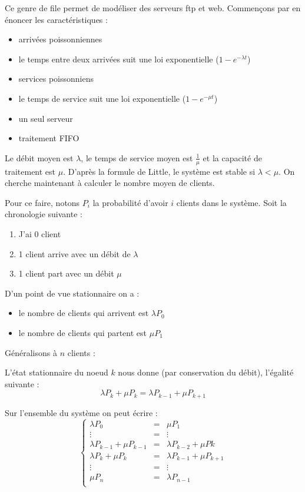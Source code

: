 \documentclass[a4paper, 11pt, fleqn]{article}
\newcommand{\inve}[1]{\frac{1}{#1}}
\begin{document}
Ce genre de file permet de modéliser des serveurs ftp et web. Commençons par en énoncer les
caractéristiques : 
\begin{itemize}
	\item arrivées poissonniennes
	\item le temps entre deux arrivées suit une loi exponentielle ($1 - e^{-\lambda t}$)
	\item services poissonniens
	\item le temps de service suit une loi exponentielle ($1 - e^{- \mu t}$)
	\item un seul serveur
	\item traitement FIFO
\end{itemize}

Le débit moyen est $\lambda$, le temps de service moyen est $\inve{\mu}$ et la capacité de
traitement est $\mu$. D'après la formule de Little, le système est stable si $\lambda < \mu$.
On cherche maintenant à calculer le nombre moyen de clients.

Pour ce faire, notons $P_i$ la probabilité d'avoir $i$ clients dans le système. Soit la chronologie
suivante : 
\begin{enumerate}
	\item J'ai 0 client
	\item 1 client arrive avec un débit de $\lambda$
	\item 1 client part avec un débit $\mu$
\end{enumerate}


D'un point de vue stationnaire on a : \begin{itemize}
	\item le nombre de clients qui arrivent est $\lambda P_0$
	\item le nombre de clients qui partent est $\mu P_1$
\end{itemize}

Généralisons à $n$ clients :

L'état stationnaire du noeud $k$ nous donne (par conservation du débit), l'égalité suivante :$$
\lambda P_k + \mu P_k = \lambda P_{k-1} + \mu P_{k+1} $$

Sur l'ensemble du système on peut écrire : $$
\left \lbrace \begin{array}{rcl}
	\lambda P_0 &=& \mu P_1 \\
	\vdots & = & \vdots \\
	\lambda P_{k-1} + \mu P_{k-1} & = & \lambda P_{k-2} + \mu P {k}\\
	\lambda P_{k} + \mu P_{k} & = & \lambda P_{k-1} + \mu P_{k+1}\\
	\vdots & = & \vdots \\
	\mu P_{n} & = & \lambda P_{n-1}\\
\end{array} \right .
$$
\end{document}
